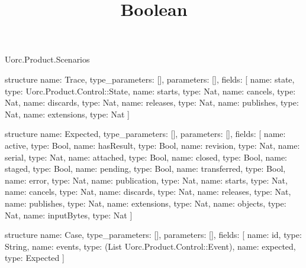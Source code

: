 \begin{lexlean}{Uorc.Product.Scenarios}
\title{Boolean}
\begin{semanticmodule}
structure{
  name: Trace,
  type_parameters: [],
  parameters: [],
  fields: [
    {name: state, type: Uorc.Product.Control::State},
    {name: starts, type: Nat},
    {name: cancels, type: Nat},
    {name: discards, type: Nat},
    {name: releases, type: Nat},
    {name: publishes, type: Nat},
    {name: extensions, type: Nat}
  ]
}

structure{
  name: Expected,
  type_parameters: [],
  parameters: [],
  fields: [
    {name: active, type: Bool},
    {name: hasResult, type: Bool},
    {name: revision, type: Nat},
    {name: serial, type: Nat},
    {name: attached, type: Bool},
    {name: closed, type: Bool},
    {name: staged, type: Bool},
    {name: pending, type: Bool},
    {name: transferred, type: Bool},
    {name: error, type: Nat},
    {name: publication, type: Nat},
    {name: starts, type: Nat},
    {name: cancels, type: Nat},
    {name: discards, type: Nat},
    {name: releases, type: Nat},
    {name: publishes, type: Nat},
    {name: extensions, type: Nat},
    {name: objects, type: Nat},
    {name: inputBytes, type: Nat}
  ]
}

structure{
  name: Case,
  type_parameters: [],
  parameters: [],
  fields: [
    {name: id, type: String},
    {name: events, type: (List Uorc.Product.Control::Event)},
    {name: expected, type: Expected}
  ]
}


\end{semanticmodule}
\end{lexlean}
